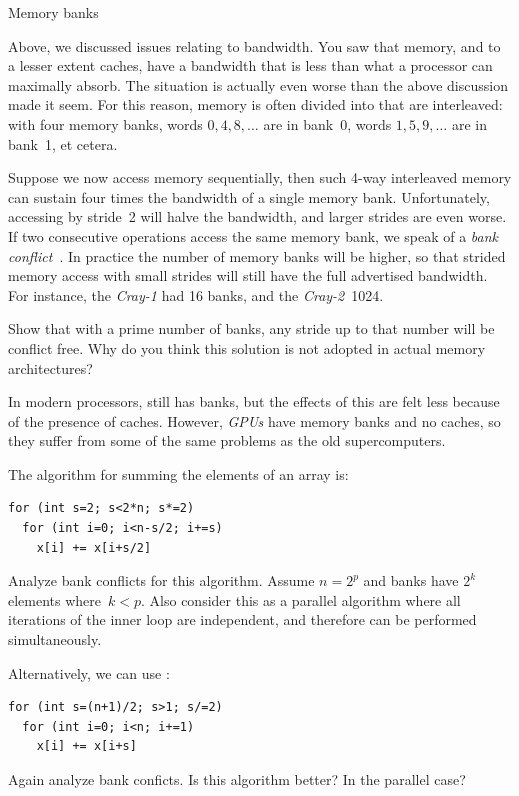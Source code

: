  {Memory banks}
\label{sec:banks}

Above, we discussed issues relating to bandwidth. You saw that memory,
and to a lesser extent caches, have a bandwidth that is less than what
a processor can maximally absorb. The situation is actually even worse
than the above discussion made it seem. For this reason, memory is
often divided into  that are interleaved: with
four memory banks, words $0,4,8,\ldots$ are in bank~0, words
$1,5,9,\ldots$ are in bank~1, et cetera. 

Suppose we now access memory sequentially, then such 4-way interleaved
memory can sustain four times the bandwidth of a single memory
bank. Unfortunately, accessing by stride~2 will halve the bandwidth,
and larger strides are even worse.
%
If two consecutive operations
access the same memory bank, we speak of a
\emph{bank conflict}~\cite{Bailey:conflict}.
%
In practice the number of memory
banks will be higher, so that strided memory access with small strides
will still have the full advertised bandwidth. For instance, the
\emph{Cray-1} had 16 banks, and the
\emph{Cray-2}~1024.

\begin{exercise}
  Show that with a prime number of banks, any stride up to that number
  will be conflict free. Why do you think this solution is not adopted
  in actual memory architectures?
\end{exercise}

In modern processors,  still has banks, but the effects
of this are felt less because of the presence of caches. However,
\emph{GPUs}%
%
have memory banks and no caches,
so they suffer from some of the same problems as the old
supercomputers.

\begin{exercise}
  The  algorithm for summing the
  elements of an array is:
\begin{lstlisting}
for (int s=2; s<2*n; s*=2)
  for (int i=0; i<n-s/2; i+=s)
    x[i] += x[i+s/2]
\end{lstlisting}
  Analyze bank conflicts for this algorithm. Assume $n=2^p$ and banks
  have $2^k$ elements where~$k<p$. Also consider this as a parallel
  algorithm where all iterations of the inner loop are independent,
  and therefore can be performed
  simultaneously.

  Alternatively, we can use :
\begin{lstlisting}
for (int s=(n+1)/2; s>1; s/=2)
  for (int i=0; i<n; i+=1)
    x[i] += x[i+s]
\end{lstlisting}
  Again analyze bank conficts. Is this algorithm better? In the
  parallel case?
\end{exercise}

